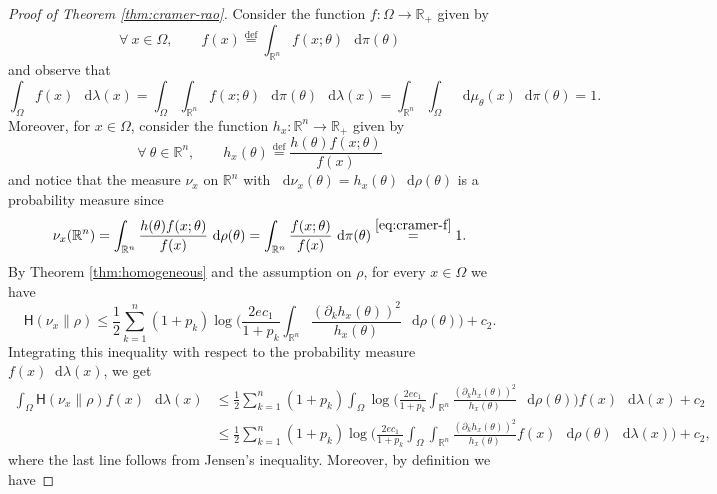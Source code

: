 \documentclass[a4paper,twoside,11pt,reqno]{amsart}
\newcommand{\eqdef}{\stackrel{\mathrm{def}}{=}}
\newcommand*\diff{\mathop{}\!\mathrm{d}}
\newcommand{\R}{\mathbb{R}} %
\newcommand{\HH}{\mathsf{H}}
\begin{document}
\begin{proof} [Proof of Theorem \ref{thm:cramer-rao}]
Consider the function $f:\Omega\to\R_+$ given by
\begin{equation} \label{eq:cramer-f}
\forall \ x\in\Omega,\qquad f(x)\eqdef \int_{\R^n} f(x;\theta) \,\diff\pi(\theta)
\end{equation}
and observe that
\begin{equation}
\int_\Omega f(x)\,\diff\lambda(x) = \int_\Omega \int_{\R^n} f(x;\theta) \,\diff\pi(\theta)\,\diff\lambda(x) = \int_{\R^n} \int_\Omega \, \diff\mu_\theta(x) \diff\pi(\theta) = 1.
\end{equation}
Moreover, for $x\in\Omega$, consider the function $h_x:\R^n\to\R_+$ given by
\begin{equation}
\forall \ \theta\in\R^n, \qquad h_x(\theta) \eqdef \frac{h(\theta)f(x;\theta)}{f(x)}
\end{equation}
and notice that the measure $\nu_x$ on $\R^n$ with $\diff\nu_x(\theta) = h_x(\theta)\diff \rho(\theta)$ is a probability measure since
\begin{equation}
\nu_x(\R^n) = \int_{\R^n} \frac{h(\theta) f(x;\theta)}{f(x)} \, \diff\rho(\theta) = \int_{\R^n} \frac{f(x;\theta)}{f(x)} \,\diff\pi(\theta)  \stackrel{\eqref{eq:cramer-f}}{=}1.
\end{equation}
By Theorem \ref{thm:homogeneous} and the assumption on $\rho$, for every $x\in\Omega$ we have
\begin{equation}
\HH(\nu_x\|\rho) \leq \frac{1}{2} \sum_{k=1}^n (1+p_k)\log\Big( \frac{2ec_1}{1+p_k} \int_{\R^n} \frac{(\partial_k h_x(\theta))^2}{h_x(\theta)}\,\diff\rho(\theta)\Big) + c_2.
\end{equation}
Integrating this inequality with respect to the probability measure $f(x)\diff\lambda(x)$, we get
\begin{equation} \label{eq:rao-long}
\begin{split}
\int_\Omega \HH(\nu_x\|\rho)f(x) \,\diff\lambda(x) & \leq \frac{1}{2} \sum_{k=1}^n (1+p_k) \int_\Omega\log\Big( \frac{2ec_1}{1+p_k} \int_{\R^n} \frac{(\partial_k h_x(\theta))^2}{h_x(\theta)}\,\diff\rho(\theta)\Big)f(x)\,\diff\lambda(x) + c_2
\\ & \leq \frac{1}{2} \sum_{k=1}^n (1+p_k) \log\Big( \frac{2ec_1}{1+p_k} \int_\Omega \int_{\R^n} \frac{(\partial_k h_x(\theta))^2}{h_x(\theta)}f(x) \,\diff\rho(\theta)\,\diff\lambda(x)\Big) + c_2,
\end{split}
\end{equation}
where the last line follows from Jensen's inequality. Moreover, by definition we have

\end{proof}
\end{document}
